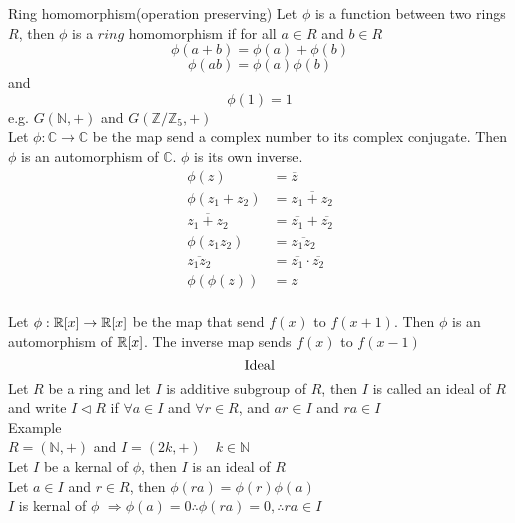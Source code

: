 \documentclass[10pt]{article}
\newcommand{\polyringr}[2][R]{\mathbb{#1}\scalebox{1}[.95]{[}#2\scalebox{1}[.95]{]}}
\begin{document}
\newpage
Ring homomorphism(operation preserving)
Let $\phi$ is a function between two rings $R$, then $\phi$ is a $\mathit{ring}$ homomorphism if
for all $a \in R$ and $b \in R$ 
\[\phi(a+b) = \phi(a) + \phi(b)\] 
\[\phi(ab) = \phi(a)\phi(b)\]
and \[\phi(1) = 1\]
e.g. $G(\mathbb{N}, +)$ and $G(\mathbb{Z}/\mathbb{Z}_5, +)$\\

Let $\phi: \mathbb{C} \rightarrow \mathbb{C}$ be the map send a complex number to its complex conjugate. Then $\phi$ is an automorphism of $\mathbb{C}$. 
$\phi$ is its own inverse.\\

\begin{equation}
\begin{aligned}
\phi(z) &= \overline{z}\\
\phi(z_1 + z_2) &= \overline{z_1 + z_2}\\
\overline{z_1 + z_2} &= \overline{z_1} + \overline{z_2}\\
\phi(z_1 z_2) &= \overline{z_1 z_2}\\
\overline{z_1 z_2} &= \overline{z_1} \cdot \overline{z_2} \nonumber\\
\phi(\phi(z)) &= z\\
\end{aligned}
\end{equation}

Let $\phi: \polyringr{x} \rightarrow  \polyringr{x}$ be the map that send $f(x)$ to $f(x+1)$. Then $\phi$ is an automorphism of $\polyringr{x}$.   
The inverse map sends $f(x)$ to $f(x-1)$\\

\[ \text{Ideal}\\ \]
Let $R$ be a ring and let $I$ is additive subgroup of $R$, then $I$ is called an ideal of $R$ and write $I \triangleleft R$ 
\quad if $\forall a \in I$ and $\forall r \in R $, and $ ar \in I$ and $ra \in I$\\

Example\\
$R = (\mathbb{N}, +)$ and $I = (2k, +) \quad k \in \mathbb{N}$\\

Let $I$ be a kernal of $\phi$, then $I$ is an ideal of $R$\\
Let $a \in I$ and $r \in R$, then $\phi(ra) = \phi(r)\phi(a)$\\
$I$ is kernal of $\phi$ $\Rightarrow \phi(a) = 0 \therefore \phi(ra) = 0, \therefore ra \in I$\\
\end{document}
